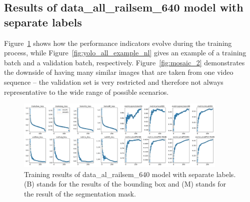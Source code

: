 \documentclass[Master,MDS,english]{BASE/twbook} %
\begin{document}
\subsection{Results of data\_all\_railsem\_640 model with separate labels}

Figure~\ref{fig:training_all_nl} shows how the performance indicators evolve during the training process, while Figure~\ref{fig:yolo_all_example_nl} gives an example of a training batch and a validation batch, respectively.
Figure~\ref{fig:mosaic_2} demonstrates the downside of having many similar images that are taken from one video sequence -- the validation set is very restricted and therefore not always representative to the wide range of possible scenarios.


\begin{figure}[H]
\centering
\includegraphics[width=0.9\textwidth]{images/yolo/all_nl/results}
\caption{Training results of data\_al\_railsem\_640 model with separate labels. (B) stands for the results of the bounding box and (M) stands for the result of the segmentation mask.}
\label{fig:training_all_nl}
\end{figure}
\end{document}
